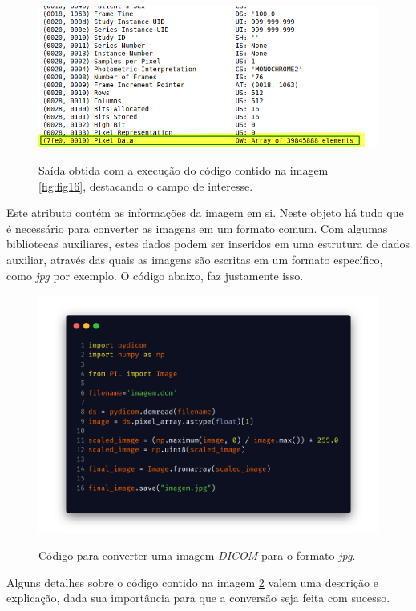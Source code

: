 \begin{figure}[H]
    \centering
    \caption{Saída obtida com a execução do código contido na imagem  \ref{fig:fig16}, destacando o campo de interesse.}
    \includegraphics[width=12cm]{fig/output_1_v2.png}
    \label{fig:fig17}
\end{figure}

Este atributo contém as informações da imagem em si. Neste objeto há tudo que é necessário para converter as imagens em um formato comum. Com algumas bibliotecas auxiliares, estes dados podem ser inseridos em uma estrutura de dados auxiliar, através das quais as imagens são escritas em um formato específico, como \textit{jpg} por exemplo. O código abaixo, faz justamente isso.

\begin{figure}[H]
    \centering
    \caption{Código para converter uma imagem \textit{DICOM} para o formato \textit{jpg}.}
    \includegraphics[width=12cm]{fig/code_2.png}
    \label{fig:fig18}
\end{figure}

Alguns detalhes sobre o código contido na imagem \ref{fig:fig18} valem uma descrição e explicação, dada sua importância para que a conversão seja feita com sucesso.


